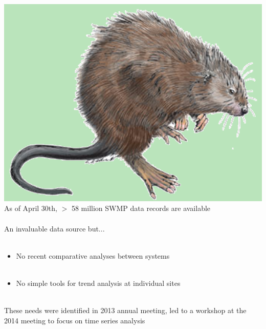 \documentclass[serif]{beamer}\usepackage[]{graphicx}\usepackage[]{color}
\begin{document}
\begin{frame}{\includegraphics[width=0.05\paperwidth]{fig/muskrat.png}\hspace{0.07in}{\bf Genesis of SWMPrats}}
As of April 30th, $>$ 58 million SWMP data records are available\\~\\
An invaluable data source but...\\~\\
\begin{itemize}
\item No recent comparative analyses between systems \\~\\
\item No simple tools for trend analysis at individual sites  \\~\\
\end{itemize}
These needs were identified in 2013 annual meeting, led to a workshop at the 2014 meeting to focus on time series analysis
\end{frame}
\end{document}

